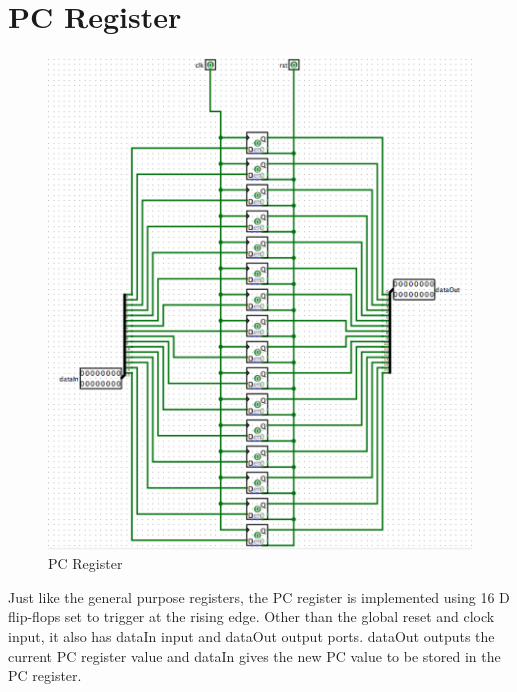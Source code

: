 \documentclass{article}
\begin{document}
	\section{PC Register}
	\begin{figure}[H]
		\begin{center}
			\includegraphics[scale=0.5]{pc}
			\caption{PC Register}
		\end{center}
	\end{figure}
	Just like the general purpose registers, the PC register is implemented using 16 D flip-flops set to trigger at the rising edge. Other than the global reset and clock input, it also has dataIn input and dataOut output ports. dataOut outputs the current PC register value and dataIn gives the new PC value to be stored in the PC register. 
	\clearpage
\end{document}
